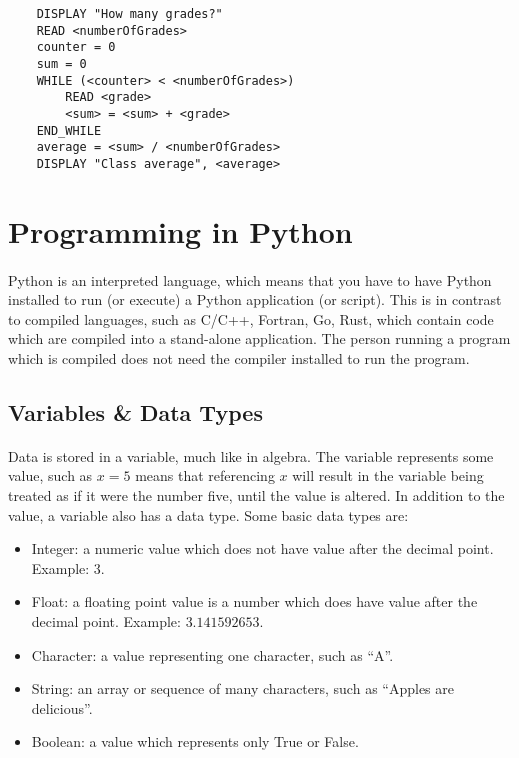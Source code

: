 \documentclass[letter,10pt]{article}
\begin{document}
\begin{verbatim}
    DISPLAY "How many grades?"
    READ <numberOfGrades>
    counter = 0
    sum = 0
    WHILE (<counter> < <numberOfGrades>)
        READ <grade>
        <sum> = <sum> + <grade>
    END_WHILE
    average = <sum> / <numberOfGrades>
    DISPLAY "Class average", <average>
\end{verbatim}

\section{Programming in Python}
\paragraph{}Python is an interpreted language, which means that you have to have Python installed to run (or execute) a Python application (or script). This is in contrast to compiled languages, such as C/C++, Fortran, Go, Rust, which contain code which are compiled into a stand-alone application. The person running a program which is compiled does not need the compiler installed to run the program.

\subsection{Variables \& Data Types}
\paragraph{}Data is stored in a variable, much like in algebra. The variable represents some value, such as $x = 5$ means that referencing $x$ will result in the variable being treated as if it were the number five, until the value is altered. In addition to the value, a variable also has a data type. Some basic data types are:

\begin{itemize}
    \item Integer: a numeric value which does not have value after the decimal point. Example: $3$.
    \item Float: a floating point value is a number which does have value after the decimal point. Example: $3.141592653$.
    \item Character: a value representing one character, such as ``A''.
    \item String: an array or sequence of many characters, such as ``Apples are delicious''.
    \item Boolean: a value which represents only True or False.
\end{itemize}
\end{document}
